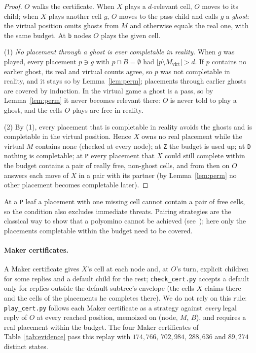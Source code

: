 \documentclass[11pt]{article}
\theoremstyle{definition}
\theoremstyle{remark}
\newcommand{\file}[1]{\texttt{#1}}
\begin{document}
\begin{proof}
$O$ walks the certificate. When $X$ plays a $d$-relevant cell, $O$ moves to its child; when $X$
plays another cell $g$, $O$ moves to the pass child and calls $g$ a \emph{ghost}: the virtual
position omits ghosts from $M$ and otherwise equals the real one, with the same budget. At
\texttt{b} nodes $O$ plays the given cell.

(1) \emph{No placement through a ghost is ever completable in reality.} When $g$ was played, every
placement $p\ni g$ with $p\cap B=\emptyset$ had $|p\setminus M_{\mathrm{virt}}|>d$. If $p$ contains no
earlier ghost, its real and virtual counts agree, so $p$ was not completable in reality, and it
stays so by Lemma~\ref{lem:perm}; placements through earlier ghosts are covered by induction. In the
virtual game a ghost is a pass, so by Lemma~\ref{lem:perm} it never becomes relevant there: $O$ is
never told to play a ghost, and the cells $O$ plays are free in reality.

(2) By (1), every placement that is completable in reality avoids the ghosts and is completable in
the virtual position. Hence $X$ owns no real placement while the virtual $M$ contains none
(checked at every node); at \texttt{Z} the budget is used up; at \texttt{D} nothing is completable;
at \texttt{P} every placement that $X$ could still complete within the budget contains a pair of
really free, non-ghost cells, and from then on $O$ answers each move of $X$ in a pair with its
partner (by Lemma~\ref{lem:perm} no other placement becomes completable later).
\end{proof}

At a \texttt{P} leaf a placement with one missing cell cannot contain a pair of free cells, so the
condition also excludes immediate threats. Pairing strategies are the classical way to show that a
polyomino cannot be achieved (see~\cite{Tho96,HSP07}); here only the placements completable within
the budget need to be covered.

\paragraph{Maker certificates.} A Maker certificate gives $X$'s cell at each node and, at $O$'s
turn, explicit children for some replies and a default child for the rest; \file{check\_cert.py}
accepts a default only for replies outside the default subtree's envelope (the cells $X$ claims there
and the cells of the placements he completes there). We do
not rely on this rule: \file{play\_cert.py} follows each Maker certificate as a strategy against
\emph{every} legal reply of $O$ at every reached position, memoized on (node, $M$, $B$), and
requires a real placement within the budget. The four Maker certificates of
Table~\ref{tab:evidence} pass this replay with $174{,}766$, $702{,}984$, $288{,}636$ and $89{,}274$
distinct states.
\end{document}
